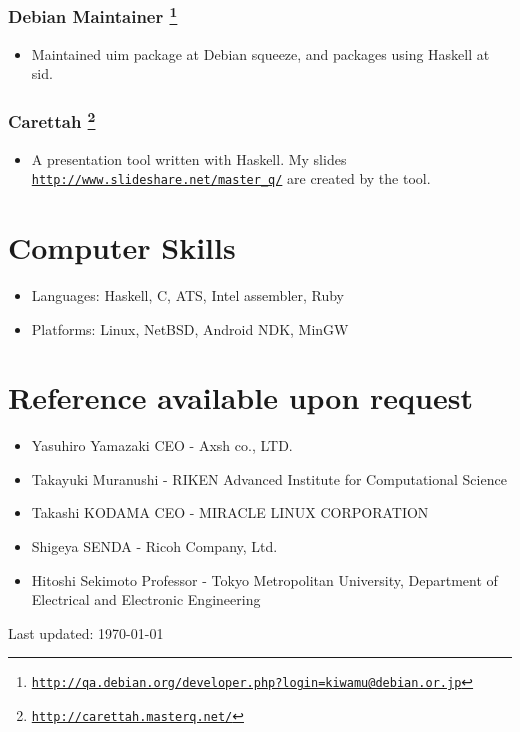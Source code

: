 \documentclass[letterpaper]{article}
\def\footer{
  \begin{center}
    \begin{footnotesize}
      Last updated: \today
    \end{footnotesize}
  \end{center}
}
\begin{document}
\subsubsection*{Debian Maintainer \footnote{\href{http://qa.debian.org/developer.php?login=kiwamu@debian.or.jp}{\tt http://qa.debian.org/developer.php?login=kiwamu@debian.or.jp}}}
\begin{itemize}
\item Maintained uim package at Debian squeeze, and packages using Haskell at sid.
\end{itemize}

\subsubsection*{Carettah \footnote{\href{http://carettah.masterq.net/}{\tt http://carettah.masterq.net/}}}
\begin{itemize}
\item A presentation tool written with Haskell. My slides \href{http://www.slideshare.net/master\_q/}{\tt http://www.slideshare.net/master\_q/} are created by the tool.
\end{itemize}

\section*{Computer Skills}

\begin{itemize}
  \item Languages: Haskell, C, ATS, Intel assembler, Ruby
  \item Platforms: Linux, NetBSD, Android NDK, MinGW
\end{itemize}

\section*{Reference available upon request}

\begin{itemize}
  \item Yasuhiro Yamazaki CEO - Axsh co., LTD.
  \item Takayuki Muranushi - RIKEN Advanced Institute for Computational Science
  \item Takashi KODAMA CEO - MIRACLE LINUX CORPORATION
  \item Shigeya SENDA - Ricoh Company, Ltd.
  \item Hitoshi Sekimoto Professor - Tokyo Metropolitan University, Department of Electrical and Electronic Engineering
\end{itemize}

\bigskip
\footer
\end{document}
